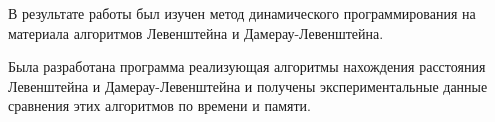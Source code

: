 \Conclusion %

В результате работы был изучен метод динамического программирования на материала алгоритмов Левенштейна и Дамерау-Левенштейна.

Была разработана программа реализующая алгоритмы нахождения расстояния Левенштейна и Дамерау-Левенштейна и получены экспериментальные данные сравнения этих алгоритмов по времени и памяти.
